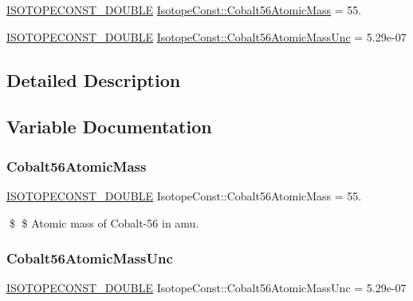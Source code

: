 \begin{DoxyCompactItemize}
\item 
\mbox{\hyperlink{group___isotope_const-_macros_ga8f45a7272ce02c0b4c65c44636ed719a}{I\+S\+O\+T\+O\+P\+E\+C\+O\+N\+S\+T\+\_\+\+D\+O\+U\+B\+LE}} \mbox{\hyperlink{group___isotope_const-_cobalt-_co56_gac31e4d9b06d318335af753b8f9ff6cc8}{Isotope\+Const\+::\+Cobalt56\+Atomic\+Mass}} = 55.
\item 
\mbox{\hyperlink{group___isotope_const-_macros_ga8f45a7272ce02c0b4c65c44636ed719a}{I\+S\+O\+T\+O\+P\+E\+C\+O\+N\+S\+T\+\_\+\+D\+O\+U\+B\+LE}} \mbox{\hyperlink{group___isotope_const-_cobalt-_co56_gaf94a3e4f8c8c6e3fd203391cd3d3def9}{Isotope\+Const\+::\+Cobalt56\+Atomic\+Mass\+Unc}} = 5.\+29e-\/07
\end{DoxyCompactItemize}


\subsection{Detailed Description}


\subsection{Variable Documentation}
\mbox{\label{group___isotope_const-_cobalt-_co56_gac31e4d9b06d318335af753b8f9ff6cc8}} 
\subsubsection{\texorpdfstring{Cobalt56\+Atomic\+Mass}{Cobalt56AtomicMass}}
{\footnotesize\ttfamily \mbox{\hyperlink{group___isotope_const-_macros_ga8f45a7272ce02c0b4c65c44636ed719a}{I\+S\+O\+T\+O\+P\+E\+C\+O\+N\+S\+T\+\_\+\+D\+O\+U\+B\+LE}} Isotope\+Const\+::\+Cobalt56\+Atomic\+Mass = 55.}

\$ \$ Atomic mass of Cobalt-\/56 in amu. \mbox{\label{group___isotope_const-_cobalt-_co56_gaf94a3e4f8c8c6e3fd203391cd3d3def9}} 
\subsubsection{\texorpdfstring{Cobalt56\+Atomic\+Mass\+Unc}{Cobalt56AtomicMassUnc}}
{\footnotesize\ttfamily \mbox{\hyperlink{group___isotope_const-_macros_ga8f45a7272ce02c0b4c65c44636ed719a}{I\+S\+O\+T\+O\+P\+E\+C\+O\+N\+S\+T\+\_\+\+D\+O\+U\+B\+LE}} Isotope\+Const\+::\+Cobalt56\+Atomic\+Mass\+Unc = 5.\+29e-\/07}

